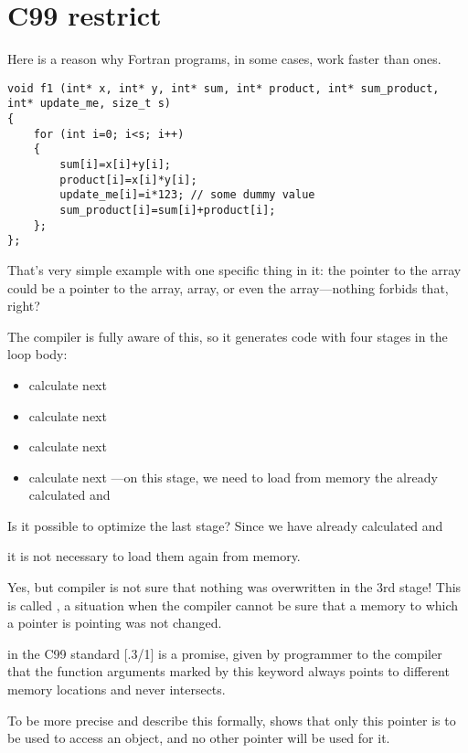 \chapter{C99 restrict}

Here is a reason why Fortran programs, in some cases, work faster than \CCpp ones.

\begin{lstlisting}
void f1 (int* x, int* y, int* sum, int* product, int* sum_product, int* update_me, size_t s)
{
	for (int i=0; i<s; i++)
	{
		sum[i]=x[i]+y[i];
		product[i]=x[i]*y[i];
		update_me[i]=i*123; // some dummy value
		sum_product[i]=sum[i]+product[i];	
	};
};
\end{lstlisting}

That's very simple example with one specific
thing in it: 
the pointer to the  array could be
a pointer to the
 array,  array, or even the 
 array---nothing forbids that, right?

The compiler is fully aware of this, so it generates code with four stages in the loop body:
\begin{itemize}
\item calculate next 
\item calculate next 
\item calculate next 
\item calculate next ---on this stage, we need to load from memory
the already calculated  and 
\end{itemize}

Is it possible to optimize the last stage?
Since we have already calculated  and  

it is not necessary to load them again from memory.

Yes, but compiler is not sure that nothing was overwritten in the 3rd stage!
This is called , 
a situation when the compiler cannot be sure that a memory to which a pointer is pointing was not changed.

 in the C99 standard [.3/1]
is a promise, given by programmer to the compiler that the function arguments 
marked by this keyword always points to different memory locations and never intersects.

To be more precise and describe this formally,  shows that only this pointer is to be used
to access an object, and no other pointer will be used for it.

